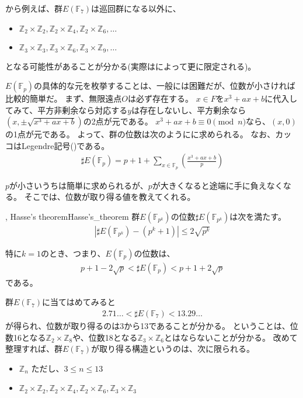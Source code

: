 から例えば、群$E(\mathbb{F}_7)$は巡回群になる以外に、
\begin{itemize}
 \item $\mathbb{Z}_2 \times \mathbb{Z}_2, \mathbb{Z}_2 \times \mathbb{Z}_4, \mathbb{Z}_2 \times \mathbb{Z}_6,\ldots$
 \item $\mathbb{Z}_3 \times \mathbb{Z}_3, \mathbb{Z}_3 \times \mathbb{Z}_6, \mathbb{Z}_3 \times \mathbb{Z}_9,\ldots$
\end{itemize}
となる可能性があることが分かる(実際はによって更に限定される)。

$E(\mathbb{F}_p)$の具体的な元を枚挙することは、一般には困難だが、位数が小さければ比較的簡単だ。
まず、無限遠点$O$は必ず存在する。
$x\in F$を$x^3+ax+b$に代入してみて、平方非剰余なら対応する$y$は存在しないし、平方剰余なら$(x,\pm\sqrt{x^3+ax+b})$の2点が元である。
$x^3+ax+b \equiv 0 \pmod{n}$なら、$(x,0)$の1点が元である。
よって、群の位数は次のようにに求められる。
なお、カッコはLegendre記号()である。
\begin{align*}
\sharp E(\mathbb{F}_p) = p + 1 + \sum_{x \in \mathbb{F}_p} \left( \frac{x^3+ax+b}{p} \right)
\end{align*}



$p$が小さいうちは簡単に求められるが、$p$が大きくなると途端に手に負えなくなる。
そこでは、位数が取り得る値を教えてくれる。

\begin{Theo}{, Hasse's theorem}{Hasse's_theorem}
群$E(\mathbb{F}_{p^k})$の位数$\sharp E(\mathbb{F}_{p^k})$は次を満たす。
\begin{align*}
|\sharp E(\mathbb{F}_{p^k}) - (p^k + 1)| \le 2\sqrt{p^k}
\end{align*}
\end{Theo}

特に$k=1$のとき、つまり、$E(\mathbb{F}_{p})$の位数は、
\begin{align*}
p+1-2\sqrt{p} < \sharp E(\mathbb{F}_{p}) < p+1+2\sqrt{p}
\end{align*}
である。

群$E(\mathbb{F}_7)$に当てはめてみると
\begin{align*}
2.71\ldots < \sharp E(\mathbb{F}_7) < 13.29\ldots
\end{align*}
が得られ、位数が取り得るのは3から13であることが分かる。
ということは、位数16となる$\mathbb{Z}_2 \times \mathbb{Z}_8$や、位数18となる$\mathbb{Z}_3 \times \mathbb{Z}_6$とはならないことが分かる。
改めて整理すれば、群$E(\mathbb{F}_7)$が取り得る構造というのは、次に限られる。
\begin{itemize}
 \item $\mathbb{Z}_n$ ただし、$3 \le n \le 13$
 \item $\mathbb{Z}_2 \times \mathbb{Z}_2, \mathbb{Z}_2 \times \mathbb{Z}_4, \mathbb{Z}_2 \times \mathbb{Z}_6, \mathbb{Z}_3 \times \mathbb{Z}_3$
\end{itemize}

